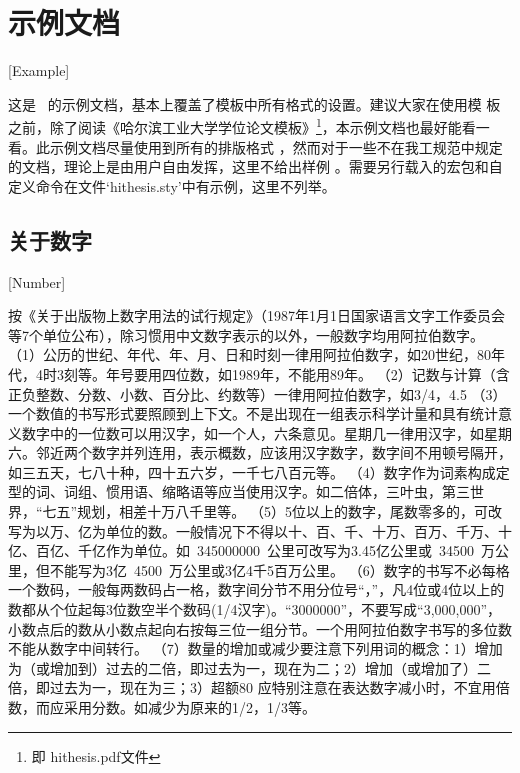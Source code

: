 
\chapter{示例文档}[Example]

这是 \hithesis\ 的示例文档，基本上覆盖了模板中所有格式的设置。建议大家在使用模
板之前，除了阅读《\hithesis\:哈尔滨工业大学学位论文模板》\footnote{即
hithesis.pdf文件}，本示例文档也最好能看一看。此示例文档尽量使用到所有的排版格式
，然而对于一些不在我工规范中规定的文档，理论上是由用户自由发挥，这里不给出样例
。需要另行载入的宏包和自定义命令在文件`hithesis.sty'中有示例，这里不列举。

\section{关于数字}[Number]

按《关于出版物上数字用法的试行规定》（1987年1月1日国家语言文字工作委员会等7个单位公布），除习惯用中文数字表示的以外，一般数字均用阿拉伯数字。
（1）公历的世纪、年代、年、月、日和时刻一律用阿拉伯数字，如20世纪，80年代，4时3刻等。年号要用四位数，如1989年，不能用89年。
（2）记数与计算（含正负整数、分数、小数、百分比、约数等）一律用阿拉伯数字，如3/4，4.5%
（3）一个数值的书写形式要照顾到上下文。不是出现在一组表示科学计量和具有统计意义数字中的一位数可以用汉字，如一个人，六条意见。星期几一律用汉字，如星期六。邻近两个数字并列连用，表示概数，应该用汉字数字，数字间不用顿号隔开，如三五天，七八十种，四十五六岁，一千七八百元等。
（4）数字作为词素构成定型的词、词组、惯用语、缩略语等应当使用汉字。如二倍体，三叶虫，第三世界，“七五”规划，相差十万八千里等。
（5）5位以上的数字，尾数零多的，可改写为以万、亿为单位的数。一般情况下不得以十、百、千、十万、百万、千万、十亿、百亿、千亿作为单位。如~\num{345000000}~公里可改写为3.45亿公里或~\num{34500}~万公里，但不能写为3亿~\num{4500}~万公里或3亿4千5百万公里。
（6）数字的书写不必每格一个数码，一般每两数码占一格，数字间分节不用分位号“，”，凡4位或4位以上的数都从个位起每3位数空半个数码(1/4汉字)。“\num{3000000}”，不要写成“3,000,000”，小数点后的数从小数点起向右按每三位一组分节。一个用阿拉伯数字书写的多位数不能从数字中间转行。
（7）数量的增加或减少要注意下列用词的概念：1）增加为（或增加到）过去的二倍，即过去为一，现在为二；2）增加（或增加了）二倍，即过去为一，现在为三；3）超额80%
应特别注意在表达数字减小时，不宜用倍数，而应采用分数。如减少为原来的1/2，1/3等。


